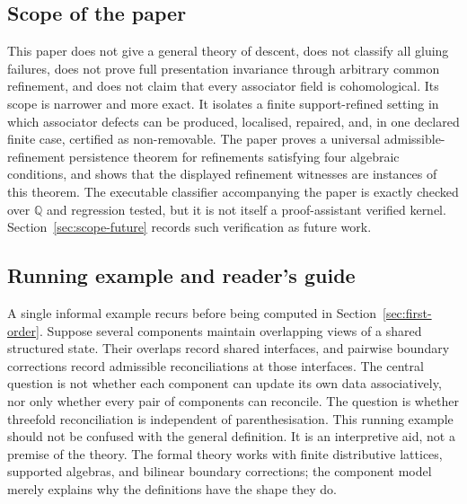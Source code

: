 \documentclass[11pt]{article}
\newcommand{\Q}{\mathbb{Q}}
\begin{document}
\subsection{Scope of the paper}

This paper does not give a general theory of descent, does not classify all gluing failures, does not prove full presentation invariance through arbitrary common refinement, and does not claim that every associator field is cohomological. Its scope is narrower and more exact. It isolates a finite support-refined setting in which associator defects can be produced, localised, repaired, and, in one declared finite case, certified as non-removable. The paper proves a universal admissible-refinement persistence theorem for refinements satisfying four algebraic conditions, and shows that the displayed refinement witnesses are instances of this theorem. The executable classifier accompanying the paper is exactly checked over \(\Q\) and regression tested, but it is not itself a proof-assistant verified kernel. Section~\ref{sec:scope-future} records such verification as future work.

\subsection{Running example and reader's guide}

A single informal example recurs before being computed in Section~\ref{sec:first-order}. Suppose several components maintain overlapping views of a shared structured state. Their overlaps record shared interfaces, and pairwise boundary corrections record admissible reconciliations at those interfaces. The central question is not whether each component can update its own data associatively, nor only whether every pair of components can reconcile. The question is whether threefold reconciliation is independent of parenthesisation. This running example should not be confused with the general definition. It is an interpretive aid, not a premise of the theory. The formal theory works with finite distributive lattices, supported algebras, and bilinear boundary corrections; the component model merely explains why the definitions have the shape they do.
\end{document}
